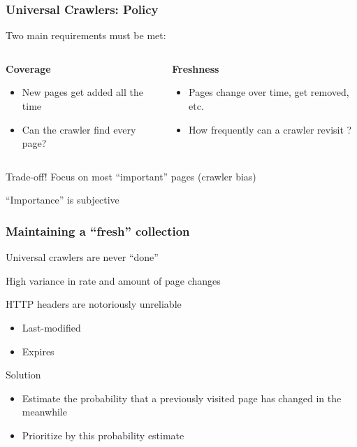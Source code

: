 \documentclass{beamer}
\begin{document}
\begin{frame} \frametitle{Universal Crawlers: Policy}


Two main requirements must be met:

  \begin{columns}[T]
    \begin{column}{0.5\textwidth}
\textbf{Coverage}

\begin{itemize}
   \item New pages get added all the time
   \item Can the crawler find every page?
\end{itemize}
 
    \end{column}
    \begin{column}{0.5\textwidth}

\textbf{Freshness}

\begin{itemize}
\item Pages change over time, get removed, etc.
\item How frequently can a crawler revisit ?
\end{itemize}

   \end{column}
\end{columns}

\vfill

\begin{block}{Trade-off!}
Focus on most ``important'' pages (crawler bias)

``Importance'' is subjective
\end{block}

\end{frame}

\begin{frame} \frametitle{Maintaining a ``fresh'' collection}

Universal crawlers are never ``done''

High variance in rate and amount of page changes

HTTP headers are notoriously unreliable
\begin{itemize}
\item Last-modified
\item Expires
\end{itemize}


\begin{block}{Solution}
\begin{itemize}
\item Estimate the probability that a previously visited page has changed in the meanwhile
\item Prioritize by this probability estimate
\end{itemize}
\end{block}

\end{frame}
\end{document}
